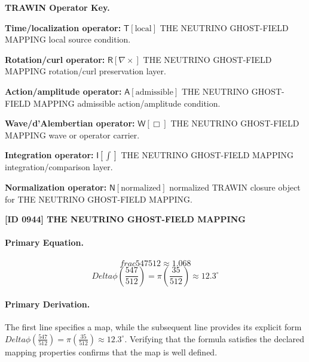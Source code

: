 \par\vspace{0.45\baselineskip}
\noindent\begin{minipage}[t]{\linewidth}
\begingroup
\small
\raggedright
\textbf{TRAWIN Operator Key.}\par
\noindent\textbf{Time/localization operator:} $\mathsf{T}\!\left[\mathrm{local}\right]$ THE NEUTRINO GHOST-FIELD MAPPING local source condition.\par
\noindent\textbf{Rotation/curl operator:} $\mathsf{R}\!\left[\nabla\times\right]$ THE NEUTRINO GHOST-FIELD MAPPING rotation/curl preservation layer.\par
\noindent\textbf{Action/amplitude operator:} $\mathsf{A}\!\left[\mathrm{admissible}\right]$ THE NEUTRINO GHOST-FIELD MAPPING admissible action/amplitude condition.\par
\noindent\textbf{Wave/d'Alembertian operator:} $\mathsf{W}\!\left[\Box\right]$ THE NEUTRINO GHOST-FIELD MAPPING wave or operator carrier.\par
\noindent\textbf{Integration operator:} $\mathsf{I}\!\left[\int\right]$ THE NEUTRINO GHOST-FIELD MAPPING integration/comparison layer.\par
\noindent\textbf{Normalization operator:} $\mathsf{N}\!\left[\mathrm{normalized}\right]$ normalized TRAWIN closure object for THE NEUTRINO GHOST-FIELD MAPPING.\par
\endgroup
\end{minipage}

\clearpage
\noindent\textbf{[ID 0944] THE NEUTRINO GHOST-FIELD MAPPING}\par
\vspace{0.35em}
\paragraph{Primary Equation.}
\[
frac{547}{512} \approx 1.068
\]
\[
Delta\phi\left(\frac{547}{512}\right) = \pi\left(\frac{35}{512}\right) \approx 12.3^\circ
\]

\paragraph{Primary Derivation.}
The first line specifies a map, while the subsequent line provides its explicit form \( Delta\phi\left(\frac{547}{512}\right) = \pi\left(\frac{35}{512}\right) \approx 12.3^\circ \). Verifying that the formula satisfies the declared mapping properties confirms that the map is well defined.
